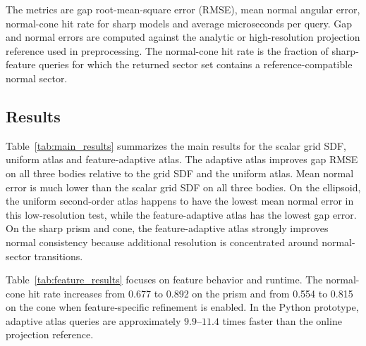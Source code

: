 \documentclass[preprint,12pt,sort&compress]{elsarticle}
\begin{document}
The metrics are gap root-mean-square error (RMSE), mean normal angular error, normal-cone hit rate for sharp models and average microseconds per query. Gap and normal errors are computed against the analytic or high-resolution projection reference used in preprocessing. The normal-cone hit rate is the fraction of sharp-feature queries for which the returned sector set contains a reference-compatible normal sector.

\subsection{Results}

Table~\ref{tab:main_results} summarizes the main results for the scalar grid SDF, uniform atlas and feature-adaptive atlas. The adaptive atlas improves gap RMSE on all three bodies relative to the grid SDF and the uniform atlas. Mean normal error is much lower than the scalar grid SDF on all three bodies. On the ellipsoid, the uniform second-order atlas happens to have the lowest mean normal error in this low-resolution test, while the feature-adaptive atlas has the lowest gap error. On the sharp prism and cone, the feature-adaptive atlas strongly improves normal consistency because additional resolution is concentrated around normal-sector transitions.

\begin{table}[htbp]
\centering
\caption{Geometric accuracy metrics for the prototype. The feature-adaptive atlas stores deeper leaves around sharp and multi-sector features.}
\label{tab:main_results}

\end{table}

Table~\ref{tab:feature_results} focuses on feature behavior and runtime. The normal-cone hit rate increases from 0.677 to 0.892 on the prism and from 0.554 to 0.815 on the cone when feature-specific refinement is enabled. In the Python prototype, adaptive atlas queries are approximately $9.9$--$11.4$ times faster than the online projection reference.
\end{document}
